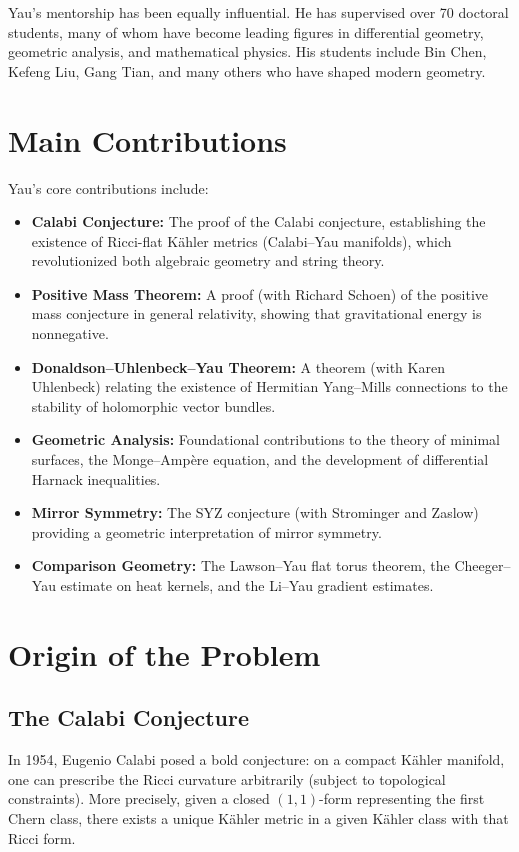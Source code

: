 Yau's mentorship has been equally influential. He has supervised over 70 doctoral students, many of whom have become leading figures in differential geometry, geometric analysis, and mathematical physics. His students include Bin Chen, Kefeng Liu, Gang Tian, and many others who have shaped modern geometry.

\section{Main Contributions}

Yau's core contributions include:
\begin{itemize}
    \item \textbf{Calabi Conjecture:} The proof of the Calabi conjecture, establishing the existence of Ricci-flat K\"ahler metrics (Calabi--Yau manifolds), which revolutionized both algebraic geometry and string theory.
    \item \textbf{Positive Mass Theorem:} A proof (with Richard Schoen) of the positive mass conjecture in general relativity, showing that gravitational energy is nonnegative.
    \item \textbf{Donaldson--Uhlenbeck--Yau Theorem:} A theorem (with Karen Uhlenbeck) relating the existence of Hermitian Yang--Mills connections to the stability of holomorphic vector bundles.
    \item \textbf{Geometric Analysis:} Foundational contributions to the theory of minimal surfaces, the Monge--Amp\`ere equation, and the development of differential Harnack inequalities.
    \item \textbf{Mirror Symmetry:} The SYZ conjecture (with Strominger and Zaslow) providing a geometric interpretation of mirror symmetry.
    \item \textbf{Comparison Geometry:} The Lawson--Yau flat torus theorem, the Cheeger--Yau estimate on heat kernels, and the Li--Yau gradient estimates.
\end{itemize}

\section{Origin of the Problem}

\subsection{The Calabi Conjecture}

In 1954, Eugenio Calabi posed a bold conjecture: on a compact K\"ahler manifold, one can prescribe the Ricci curvature arbitrarily (subject to topological constraints). More precisely, given a closed $(1,1)$-form representing the first Chern class, there exists a unique K\"ahler metric in a given K\"ahler class with that Ricci form.

